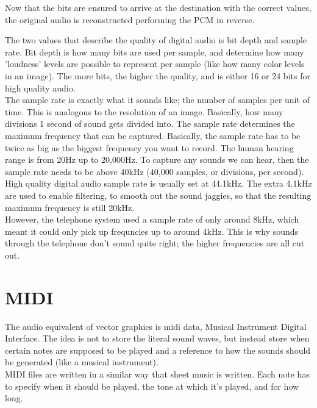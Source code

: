 Now that the bits are ensured to arrive at the destination with the correct values, the original audio is reconstructed performing the PCM in reverse.

\begin{center}\end{center}

The two values that describe the quality of digital audio is bit depth and sample rate. Bit depth is how many bits are used per sample, and determine how many 'loudness' levels are possible to represent per sample (like how many color levels in an image). The more bits, the higher the quality, and is either 16 or 24 bits for high quality audio.\\

The sample rate is exactly what it sounds like; the number of samples per unit of time. This is analogous to the resolution of an image. Basically, how many divisions 1 second of sound gets divided into. The sample rate determines the maximum frequency that can be captured. Basically, the sample rate has to be twice as big as the biggest frequency you want to record. The human hearing range is from 20Hz up to 20,000Hz. To capture any sounds we can hear, then the sample rate needs to be above 40kHz (40,000 samples, or divisions, per second). High quality digital audio sample rate is usually set at 44.1kHz. The extra 4.1kHz are used to enable filtering, to smooth out the sound jaggies, so that the resulting maximum frequency is still 20kHz.\\

However, the telephone system used a sample rate of only around 8kHz, which meant it could only pick up frequncies up to around 4kHz. This is why sounds through the telephone don't sound quite right; the higher frequencies are all cut out.

\section{MIDI}

The audio equivalent of vector graphics is midi data, Musical Instrument Digital Interface. The idea is not to store the literal sound waves, but instead store when certain notes are supposed to be played and a reference to how the sounds should be generated (like a musical instrument).\\

MIDI files are written in a similar way that sheet music is written. Each note has to specify when it should be played, the tone at which it's played, and for how long.

